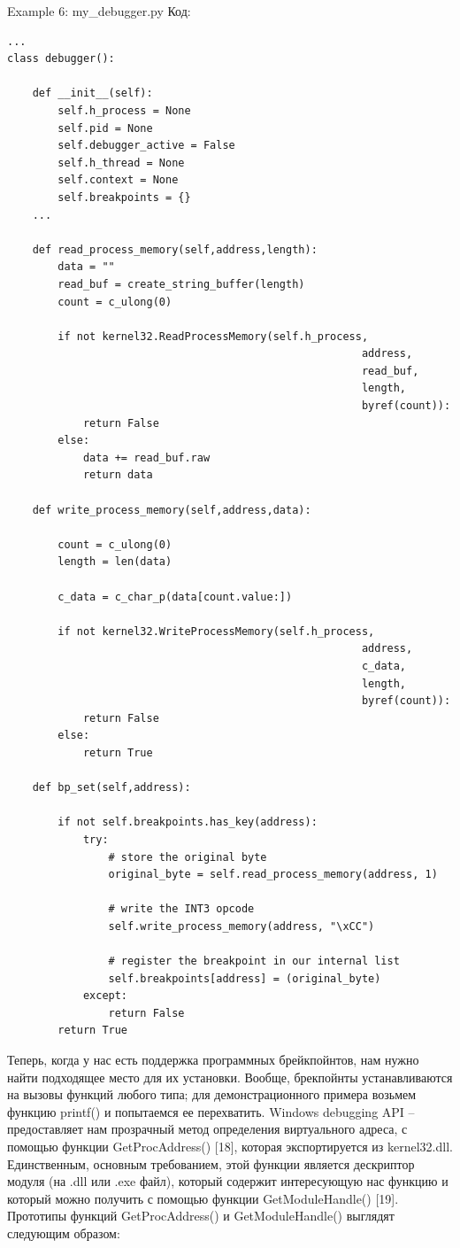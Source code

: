 \documentclass[12pt, a4paper, oneside]{book}
\begin{document}
Example 6: my\_debugger.py
Код:
\begin{verbatim}
...
class debugger():

    def __init__(self):
        self.h_process = None
        self.pid = None
        self.debugger_active = False
        self.h_thread = None
        self.context = None
        self.breakpoints = {}
    ...

    def read_process_memory(self,address,length):
        data = ""
        read_buf = create_string_buffer(length)
        count = c_ulong(0)

        if not kernel32.ReadProcessMemory(self.h_process,
                                                        address,
                                                        read_buf,
                                                        length,
                                                        byref(count)):
            return False
        else:
            data += read_buf.raw
            return data

    def write_process_memory(self,address,data):

        count = c_ulong(0)
        length = len(data)

        c_data = c_char_p(data[count.value:])

        if not kernel32.WriteProcessMemory(self.h_process,
                                                        address,
                                                        c_data,
                                                        length,
                                                        byref(count)):
            return False
        else:
            return True

    def bp_set(self,address):

        if not self.breakpoints.has_key(address):
            try:
                # store the original byte
                original_byte = self.read_process_memory(address, 1)

                # write the INT3 opcode
                self.write_process_memory(address, "\xCC")

                # register the breakpoint in our internal list
                self.breakpoints[address] = (original_byte)
            except:
                return False
        return True
\end{verbatim}

Теперь, когда у нас есть поддержка программных брейкпойнтов, нам нужно найти подходящее место для их установки. Вообще, брекпойнты устанавливаются на вызовы функций любого типа; для демонстрационного примера возьмем функцию printf() и попытаемся ее перехватить. Windows debugging API – предоставляет нам прозрачный метод определения виртуального адреса, с помощью функции GetProcAddress() [18], которая экспортируется из kernel32.dll. Единственным, основным требованием, этой функции является дескриптор модуля (на .dll или .exe файл), который содержит интересующую нас функцию и который можно получить с помощью функции GetModuleHandle() [19]. Прототипы функций GetProcAddress() и GetModuleHandle() выглядят следующим образом:
\end{document}
